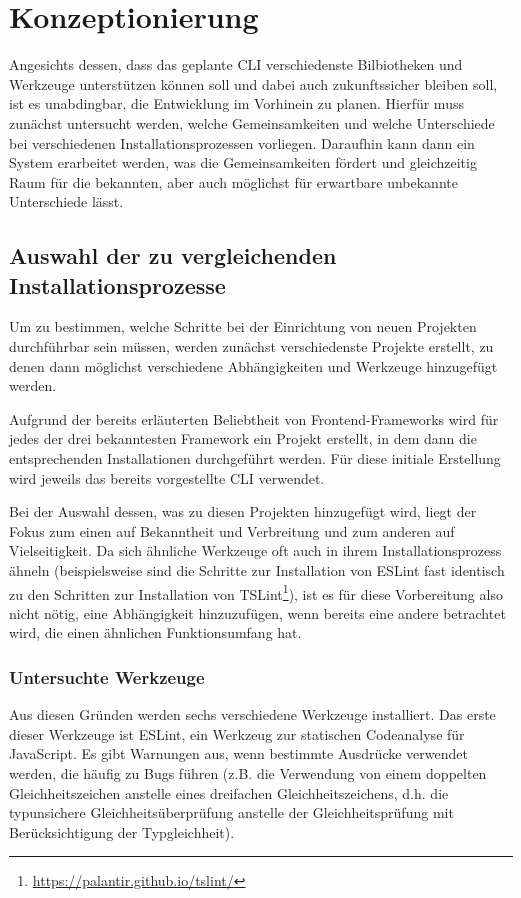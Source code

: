 \section{Konzeptionierung}
\label{komzeptionierung}
Angesichts dessen, dass das geplante \gls{CLI} verschiedenste Bilbiotheken und Werkzeuge unterstützen können soll und dabei auch zukunftssicher bleiben soll, ist es unabdingbar, die Entwicklung im Vorhinein zu planen. Hierfür muss zunächst untersucht werden, welche Gemeinsamkeiten und welche Unterschiede bei verschiedenen Installationsprozessen vorliegen. Daraufhin kann dann ein System erarbeitet werden, was die Gemeinsamkeiten fördert und gleichzeitig Raum für die bekannten, aber auch möglichst für erwartbare unbekannte Unterschiede lässt.

\subsection{Auswahl der zu vergleichenden Installationsprozesse}
Um zu bestimmen, welche Schritte bei der Einrichtung von neuen Projekten durchführbar sein müssen, werden zunächst verschiedenste Projekte erstellt, zu denen dann möglichst verschiedene Abhängigkeiten und Werkzeuge hinzugefügt werden.

Aufgrund der bereits erläuterten Beliebtheit von Frontend-Frameworks wird für jedes der drei bekanntesten Framework ein Projekt erstellt, in dem dann die entsprechenden Installationen durchgeführt werden. Für diese initiale Erstellung wird jeweils das bereits vorgestellte \gls{CLI} verwendet.

Bei der Auswahl dessen, was zu diesen Projekten hinzugefügt wird, liegt der Fokus zum einen auf Bekanntheit und Verbreitung und zum anderen auf Vielseitigkeit. Da sich ähnliche Werkzeuge oft auch in ihrem Installationsprozess ähneln (beispielsweise sind die Schritte zur Installation von ESLint fast identisch zu den Schritten zur Installation von TSLint\footnote{\url{https://palantir.github.io/tslint/}}), ist es für diese Vorbereitung also nicht nötig, eine Abhängigkeit hinzuzufügen, wenn bereits eine andere betrachtet wird, die einen ähnlichen Funktionsumfang hat.

\subsubsection{Untersuchte Werkzeuge}
Aus diesen Gründen werden sechs verschiedene Werkzeuge installiert. Das erste dieser Werkzeuge ist ESLint, ein Werkzeug zur statischen Codeanalyse für JavaScript. Es gibt Warnungen aus, wenn bestimmte Ausdrücke verwendet werden, die häufig zu Bugs führen (z.B. die Verwendung von einem doppelten Gleichheitszeichen anstelle eines dreifachen Gleichheitszeichens, d.h. die typunsichere Gleichheitsüberprüfung anstelle der Gleichheitsprüfung mit Berücksichtigung der Typgleichheit).


